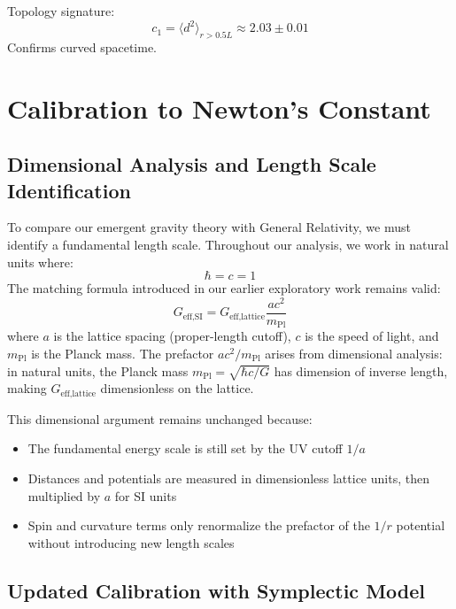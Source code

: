 \documentclass[prd,twocolumn,showpacs,superscriptaddress]{revtex4-2}
\begin{document}
	Topology signature:
	\begin{equation}
		c_1 = \langle d^2 \rangle_{r > 0.5L} \approx 2.03 \pm 0.01
	\end{equation}
	Confirms curved spacetime.
	
	\section{Calibration to Newton's Constant}
	
	\subsection{Dimensional Analysis and Length Scale Identification}
	
	To compare our emergent gravity theory with General Relativity, we must identify a fundamental length scale. Throughout our analysis, we work in natural units where:
	\begin{equation}
		\hbar = c = 1
		\label{eq:natural_units}
	\end{equation}
	The matching formula introduced in our earlier exploratory work remains valid:
	\begin{equation}
		G_{\text{eff,SI}} = G_{\text{eff,lattice}} \frac{a c^2}{m_{\text{Pl}}}
		\label{eq:newton_conversion}
	\end{equation}
	where $a$ is the lattice spacing (proper-length cutoff), $c$ is the speed of light, and $m_{\text{Pl}}$ is the Planck mass. The prefactor $ac^2/m_{\text{Pl}}$ arises from dimensional analysis: in natural units, the Planck mass $m_{\text{Pl}} = \sqrt{\hbar c/G}$ has dimension of inverse length, making $G_{\text{eff,lattice}}$ dimensionless on the lattice.
	
	This dimensional argument remains unchanged because:
	\begin{itemize}
		\item The fundamental energy scale is still set by the UV cutoff $1/a$
		\item Distances and potentials are measured in dimensionless lattice units, then multiplied by $a$ for SI units
		\item Spin and curvature terms only renormalize the prefactor of the $1/r$ potential without introducing new length scales
	\end{itemize}
	
	\subsection{Updated Calibration with Symplectic Model}
	
\end{document}
